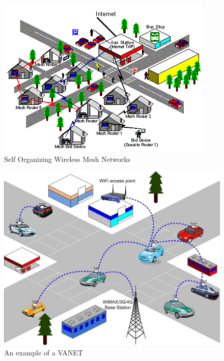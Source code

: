		\noindent
		\begin{minipage}{0.52\textwidth}%
			\begin{figure}[H]
				\centering
				\includegraphics[width=\textwidth]{resources/img/chap4/wms_microsoft}
				\caption[Self Organizing Wireless Mesh Networks]{Self Organizing Wireless Mesh Networks \cite{bahl2009opportunistic}}
				\label{img:wms_microsoft}
			\end{figure}
		\end{minipage}%
		\hfill%
		\begin{minipage}{0.48\textwidth}\raggedright
			\begin{figure}[H]
				\centering
				\includegraphics[width=\textwidth]{resources/img/chap4/vanet}
				\caption[An example of a VANET]{An example of a VANET \cite{BADIS2015653}}
				\label{img:vanet}
			\end{figure}
		\end{minipage}
	
